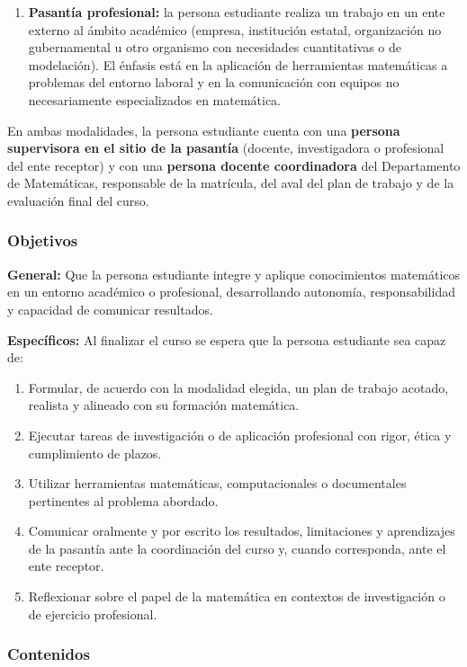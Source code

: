 \begin{refsection}
\begin{enumerate}
\item \textbf{Pasantía profesional:} la persona estudiante realiza un trabajo en un ente externo al ámbito académico (empresa, institución estatal, organización no gubernamental u otro organismo con necesidades cuantitativas o de modelación). El énfasis está en la aplicación de herramientas matemáticas a problemas del entorno laboral y en la comunicación con equipos no necesariamente especializados en matemática.
\end{enumerate}

En ambas modalidades, la persona estudiante cuenta con una \textbf{persona supervisora en el sitio de la pasantía} (docente, investigadora o profesional del ente receptor) y con una \textbf{persona docente coordinadora} del Departamento de Matemáticas, responsable de la matrícula, del aval del plan de trabajo y de la evaluación final del curso.

\subsubsection*{Objetivos}

\textbf{General:} Que la persona estudiante integre y aplique conocimientos matemáticos en un entorno académico o profesional, desarrollando autonomía, responsabilidad y capacidad de comunicar resultados.

\textbf{Específicos:} Al finalizar el curso se espera que la persona estudiante sea capaz de:

\begin{enumerate}
\item Formular, de acuerdo con la modalidad elegida, un plan de trabajo acotado, realista y alineado con su formación matemática.
\item Ejecutar tareas de investigación o de aplicación profesional con rigor, ética y cumplimiento de plazos.
\item Utilizar herramientas matemáticas, computacionales o documentales pertinentes al problema abordado.
\item Comunicar oralmente y por escrito los resultados, limitaciones y aprendizajes de la pasantía ante la coordinación del curso y, cuando corresponda, ante el ente receptor.
\item Reflexionar sobre el papel de la matemática en contextos de investigación o de ejercicio profesional.
\end{enumerate}

\subsubsection*{Contenidos}


\end{refsection}
